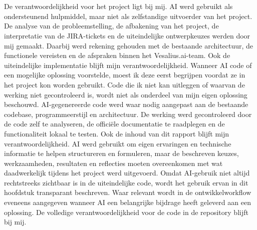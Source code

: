 \section{}%
\label{sec:ai-eigenwerk}
De verantwoordelijkheid voor het project ligt bij mij. AI werd gebruikt als ondersteunend hulpmiddel, maar niet als zelfstandige uitvoerder van het project.
De analyse van de probleemstelling, de afbakening van het project, de interpretatie van de JIRA-tickets en de uiteindelijke ontwerpkeuzes werden door mij gemaakt. Daarbij werd rekening gehouden met de bestaande architectuur, de functionele vereisten en de afspraken binnen het Vesalius.ai-team.
Ook de uiteindelijke implementatie blijft mijn verantwoordelijkheid. Wanneer AI code of een mogelijke oplossing voorstelde, moest ik deze eerst begrijpen voordat ze in het project kon worden gebruikt. Code die ik niet kan uitleggen of waarvan de werking niet gecontroleerd is, wordt niet als onderdeel van mijn eigen oplossing beschouwd.
AI-gegenereerde code werd waar nodig aangepast aan de bestaande codebase, programmeerstijl en architectuur. De werking werd gecontroleerd door de code zelf te analyseren, de officiële documentatie te raadplegen en de functionaliteit lokaal te testen.
Ook de inhoud van dit rapport blijft mijn verantwoordelijkheid. AI werd gebruikt om eigen ervaringen en technische informatie te helpen structureren en formuleren, maar de beschreven keuzes, werkzaamheden, resultaten en reflecties moeten overeenkomen met wat daadwerkelijk tijdens het project werd uitgevoerd.
Omdat AI-gebruik niet altijd rechtstreeks zichtbaar is in de uiteindelijke code, wordt het gebruik ervan in dit hoofdstuk transparant beschreven. Waar relevant wordt in de ontwikkelworkflow eveneens aangegeven wanneer AI een belangrijke bijdrage heeft geleverd aan een oplossing. De volledige verantwoordelijkheid voor de code in de repository blijft bij mij.

